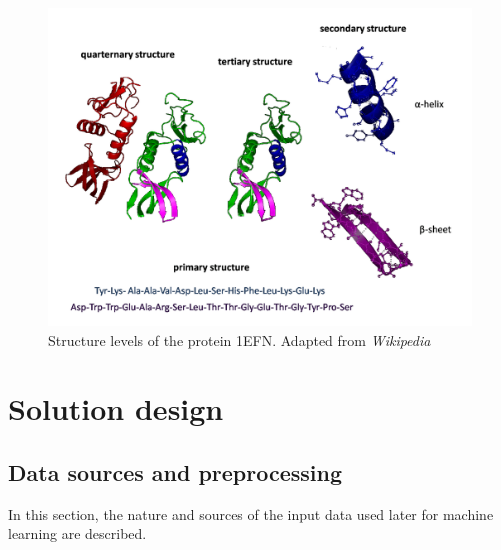 \documentclass[11pt,twoside,a4paper]{book}
\begin{document}
\begin{landscape}
\begin{figure}[h]
\begin{center}
\includegraphics[width=21cm]{figures/Protein_structure}
\caption[Structure levels of the protein 1EFN]{Structure levels of the protein 1EFN. Adapted from \emph{Wikipedia}}
\label{fig:Protein_structure}
\end{center}
\end{figure}
\end{landscape}



\chapter{Solution design}
\label{ch:sol}

\section{Data sources and preprocessing}
\label{sec:data}
In this section, the nature and sources of the input data used later for machine learning are described.
\end{document}
